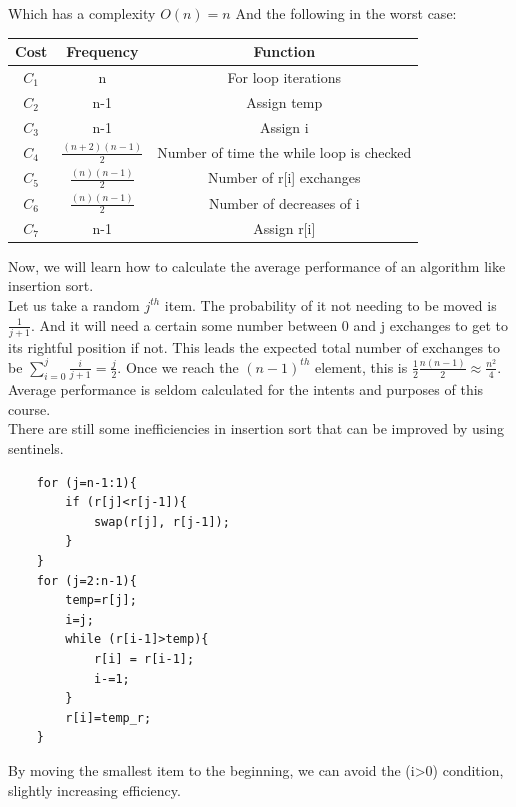 \documentclass[nobib]{tufte-handout}
\begin{document}
Which has a complexity $O(n)=n$
And the following in the worst case:
\begin{table}
    \centering
    \begin{tabular}{c|c|c}
        Cost  & Frequency              & Function                                 \\
        \hline
        $C_1$ & n                      & For loop iterations                      \\
        $C_2$ & n-1                    & Assign temp                              \\
        $C_3$ & n-1                    & Assign i                                 \\
        $C_4$ & $\frac{(n+2)(n-1)}{2}$ & Number of time the while loop is checked \\
        $C_5$ & $\frac{(n)(n-1)}{2}$   & Number of r[i] exchanges                 \\
        $C_6$ & $\frac{(n)(n-1)}{2}$   & Number of decreases of i                 \\
        $C_7$ & n-1                    & Assign r[i]                              \\
    \end{tabular}
\end{table}
Now, we will learn how to calculate the average performance of an algorithm like insertion sort.\\
Let us take a random $j^{th}$ item. The probability of it not needing to be moved is $\frac{1}{j+1}$. And it will need a certain some number between 0 and j exchanges to get to its rightful position if not.
This leads the expected total number of exchanges to be $\sum_{i=0}^j\frac{i}{j+1} = \frac{j}{2}$. Once we reach the $(n-1)^{th}$ element, this is $\frac{1}{2}\frac{n(n-1)}{2}\approx\frac{n^2}{4}$.\\ Average performance is seldom calculated for the intents and purposes of this course.\\
There are still some inefficiencies in insertion sort that can be improved by using sentinels.
\begin{lstlisting}
    for (j=n-1:1){
        if (r[j]<r[j-1]){
            swap(r[j], r[j-1]);
        }
    }
    for (j=2:n-1){
        temp=r[j];
        i=j;
        while (r[i-1]>temp){
            r[i] = r[i-1];
            i-=1;
        }
        r[i]=temp_r;
    }
\end{lstlisting}
By moving the smallest item to the beginning, we can avoid the (i>0) condition,
slightly increasing efficiency.\\
\end{document}
